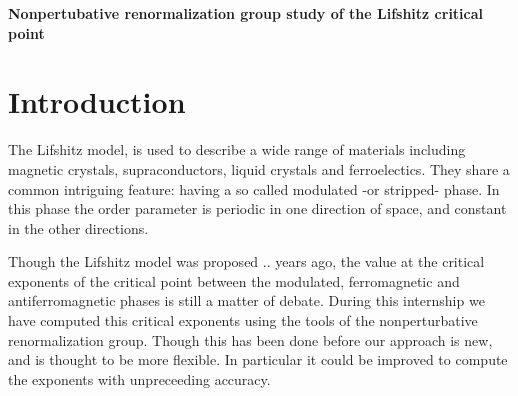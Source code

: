 %
%

\pagebreak

\begin{center}
\Huge \textbf{Nonpertubative renormalization group study of the Lifshitz critical point}
\end{center}


\section*{\Huge{Introduction}}

The Lifshitz model, is used to describe a wide range of materials including magnetic crystals, supraconductors, liquid crystals and ferroelectics. 
They share a common intriguing feature: having a so called modulated -or stripped- phase. In this phase the order parameter is periodic in one direction of space, and constant in the other directions. 

Though the Lifshitz model was proposed .. years ago, the value at the critical exponents of the critical point between the modulated, ferromagnetic and antiferromagnetic phases is still a matter of debate. During this internship we have computed this critical exponents using the tools of the nonperturbative renormalization group. Though this has been done before \cite{MouhannaLif} \cite{BervillierLif} our approach is new, and is thought to be more flexible. In particular it could be improved to compute the exponents with unpreceeding accuracy.

